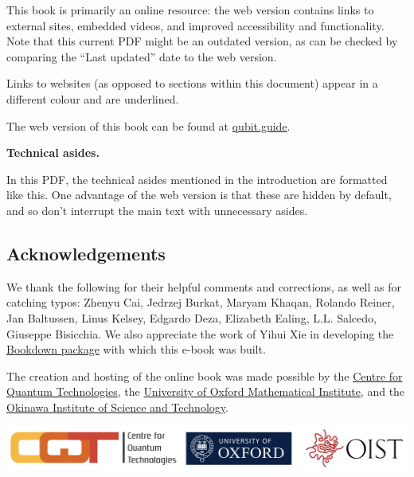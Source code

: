 \documentclass[fleqn,a4paper]{article}
\newenvironment{idea}{\everypar{\setlength{\parindent}{1.5em}}}{}
\newenvironment{technical}[1]{\textbf{#1.}\par\vspace{.5\baselineskip}\everypar{\setlength{\parindent}{1.5em}}}{}
\theoremstyle{definition}
\theoremstyle{definition}
\theoremstyle{definition}
\theoremstyle{definition}
\theoremstyle{remark}
\begin{document}
This book is primarily an online resource: the web version contains links to external sites, embedded videos, and improved accessibility and functionality.
Note that this current PDF might be an outdated version, as can be checked by comparing the ``Last updated'' date to the web version.

Links to websites (as opposed to sections within this document) appear in a different colour and are underlined.

\begin{idea}
The web version of this book can be found at \href{https://qubit.guide}{qubit.guide}.

\end{idea}

\begin{technical}{Technical asides}
In this PDF, the technical asides mentioned in the introduction are formatted like this.
One advantage of the web version is that these are hidden by default, and so don't interrupt the main text with unnecessary asides.

\end{technical}

\hypertarget{acknowledgements}{%
\subsection*{Acknowledgements}\label{acknowledgements}}

We thank the following for their helpful comments and corrections, as well as for catching typos: Zhenyu Cai, Jedrzej Burkat, Maryam Khaqan, Rolando Reiner, Jan Baltussen, Linus Kelsey, Edgardo Deza, Elizabeth Ealing, L.L. Salcedo, Giuseppe Bisicchia.
We also appreciate the work of Yihui Xie in developing the \href{https://bookdown.org/yihui/bookdown/}{Bookdown package} with which this e-book was built.

The creation and hosting of the online book was made possible by the \href{https://cqt.quantumlah.org/}{Centre for Quantum Technologies}, the \href{https://www.maths.ox.ac.uk/}{University of Oxford Mathematical Institute}, and the \href{https://www.oist.jp/}{Okinawa Institute of Science and Technology}.

\begin{center}\includegraphics[width=0.9\linewidth]{images/sponsors} \end{center}
\end{document}
